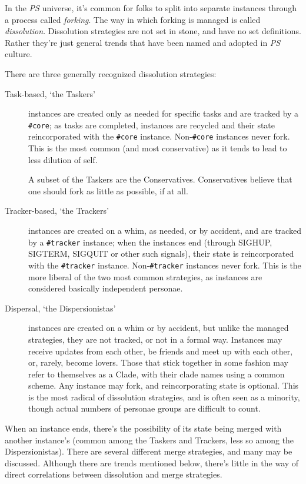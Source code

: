 In the \emph{PS} universe, it's common for folks to split into separate instances through a process called \emph{forking}. The way in which forking is managed is called \emph{dissolution}. Dissolution strategies are not set in stone, and have no set definitions. Rather they're just general trends that have been named and adopted in \emph{PS} culture.

There are three generally recognized dissolution strategies:

\begin{description}
\item[Task-based, `the Taskers']
instances are created only as needed for specific tasks and are tracked by a \texttt{\#core}; as tasks are completed, instances are recycled and their state reincorporated with the \texttt{\#core} instance. Non-\texttt{\#core} instances never fork. This is the most common (and most conservative) as it tends to lead to less dilution of self.

A subset of the Taskers are the Conservatives. Conservatives believe that one should fork as little as possible, if at all.
\item[Tracker-based, `the Trackers']
instances are created on a whim, as needed, or by accident, and are tracked by a \texttt{\#tracker} instance; when the instances end (through SIGHUP, SIGTERM, SIGQUIT or other such signals), their state is reincorporated with the \texttt{\#tracker} instance. Non-\texttt{\#tracker} instances never fork. This is the more liberal of the two most common strategies, as instances are considered basically independent personae.
\item[Dispersal, `the Dispersionistas']
instances are created on a whim or by accident, but unlike the managed strategies, they are not tracked, or not in a formal way. Instances may receive updates from each other, be friends and meet up with each other, or, rarely, become lovers. Those that stick together in some fashion may refer to themselves as a Clade, with their clade names using a common scheme. Any instance may fork, and reincorporating state is optional. This is the most radical of dissolution strategies, and is often seen as a minority, though actual numbers of personae groups are difficult to count.
\end{description}

When an instance ends, there's the possibility of its state being merged with another instance's (common among the Taskers and Trackers, less so among the Dispersionistas). There are several different merge strategies, and many may be discussed. Although there are trends mentioned below, there's little in the way of direct correlations between dissolution and merge strategies.

